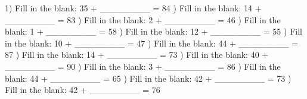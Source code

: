 \documentclass{article}%
\begin{document}
1) Fill in the blank: 35 + \_\_\_\_\_\_\_\_ = 84%
\newline%
\newline%
) Fill in the blank: 14 + \_\_\_\_\_\_\_\_ = 83%
\newline%
\newline%
) Fill in the blank: 2 + \_\_\_\_\_\_\_\_ = 46%
\newline%
\newline%
) Fill in the blank: 1 + \_\_\_\_\_\_\_\_ = 58%
\newline%
\newline%
) Fill in the blank: 12 + \_\_\_\_\_\_\_\_ = 55%
\newline%
\newline%
) Fill in the blank: 10 + \_\_\_\_\_\_\_\_ = 47%
\newline%
\newline%
) Fill in the blank: 44 + \_\_\_\_\_\_\_\_ = 87%
\newline%
\newline%
) Fill in the blank: 14 + \_\_\_\_\_\_\_\_ = 73%
\newline%
\newline%
) Fill in the blank: 40 + \_\_\_\_\_\_\_\_ = 90%
\newline%
\newline%
) Fill in the blank: 3 + \_\_\_\_\_\_\_\_ = 86%
\newline%
\newline%
) Fill in the blank: 44 + \_\_\_\_\_\_\_\_ = 65%
\newline%
\newline%
) Fill in the blank: 42 + \_\_\_\_\_\_\_\_ = 73%
\newline%
\newline%
) Fill in the blank: 42 + \_\_\_\_\_\_\_\_ = 76%
\newline%
\newline%
\newline%
\end{document}
